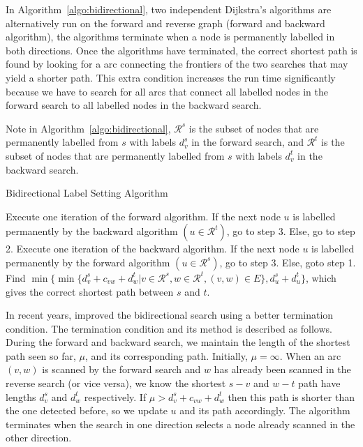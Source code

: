 In Algorithm~\ref{algo:bidirectional},
two independent Dijkstra's algorithms are alternatively run on the forward  and reverse graph (forward and backward algorithm),
the algorithms terminate when a node is permanently labelled in both directions.   
Once the algorithms have terminated,
the correct shortest path is found by looking for a arc connecting the frontiers of the two searches that may yield a shorter path.
This extra condition increases the run time significantly because 
we have to search for all arcs that connect all labelled nodes in the forward search to all labelled nodes in the backward search.

Note in Algorithm~\ref{algo:bidirectional},
$\mathcal{R}^s$ is the subset of nodes that are permanently labelled from $s$ with labels $d_v^s$ in the forward search, and 
$\mathcal{R}^t$ is the subset of nodes that are permanently labelled from $s$ with labels $d_v^t$ in the backward search.

\begin{algorithm}[H]
    \caption{Bidirectional Label Setting Algorithm }
    \label{algo:bidirectional}
    \begin{algorithmic}[1]
        \State Execute one iteration of the forward algorithm.
        If the next node $u$ is labelled permanently by the 
        backward algorithm $(u\in\mathcal{R}^t)$, go to step 3.
        Else, go to step 2.
        \State Execute one iteration of the backward algorithm.
        If the next node $u$ is labelled permanently by the
        forward algorithm $(u\in\mathcal{R}^s)$, go to step 3.
        Else, goto step 1.
        \State Find $\min\{\min\{d_v^s + c_{vw} + d_w^t | v \in \mathcal{R}^s, w \in \mathcal{R}^t, (v, w) \in E\}, d_u^s + d_u^t\}$, which gives the correct shortest path between $s$ and $t$.
    \EndProcedure
\end{algorithmic}
\end{algorithm}

In recent years,
\citet{Goldberg05} improved the bidirectional search using a better termination condition.
The termination condition and its method is described as follows.
During the forward and backward search,
we maintain the length of the shortest path seen so far, $\mu$, and its corresponding path. Initially, $\mu = \infty$.
When an arc $(v,w)$ is scanned by the forward search and $w$ has already been scanned in the reverse search (or vice versa),
we know the shortest $s-v$ and $w-t$ path have lengths $d_v^s$ and $d_w^t$ respectively.
If $\mu > d_v^s + c_{vw} + d_w^t$ then this path is shorter than the one detected before, 
so we update $u$ and its path accordingly.
The algorithm terminates when the search in one direction selects a node already scanned in the other direction.

